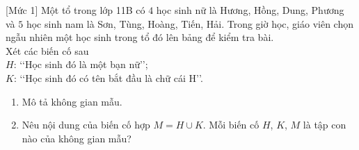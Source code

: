 \begin{bt}%
[Mức 1]
	Một tổ trong lớp 11B có $4$ học sinh nữ là Hương, Hồng, Dung, Phương và $5$ học sinh nam là Sơn, Tùng, Hoàng, Tiến, Hải. Trong giờ học, giáo viên chọn ngẫu nhiên một học sinh trong tổ đó lên bảng để kiểm tra bài.\\
	Xét các biến cố sau\\
	$H$: \lq\lq Học sinh đó là một bạn nữ\rq\rq;\\
	$K$: \lq\lq Học sinh đó có tên bắt đầu là chữ cái $\mathrm{H}$\rq\rq.
	\begin{enumerate}
		\item Mô tả không gian mẫu.
		\item Nêu nội dung của biến cố hợp $M = H \cup K$. Mỗi biến cố $H$, $K$, $M$ là tập con nào của không gian mẫu?
	\end{enumerate}
\end{bt}

